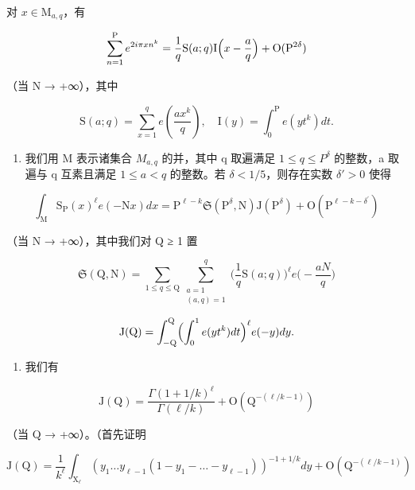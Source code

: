 对 \(x\in \mathrm{M}_{a,q}\)，有

\[
\sum_ {n = 1} ^ {\mathrm{P}} e ^ {2 i \pi x n ^ {k}} = \frac {1}{q} \mathrm{S} (a; q) \mathrm{I} \Bigl (x - \frac {a}{q} \Bigr) + \mathrm{O} (\mathrm{P} ^ {2 \delta})
\]

（当 N → +∞），其中

\[
\mathrm{S} (a; q) = \sum_ {x = 1} ^ {q} e \left(\frac {a x ^ {k}}{q}\right), \quad \mathrm{I} (y) = \int_ {0} ^ {\mathrm{P}} e \left(y t ^ {k}\right) d t.
\]

\begin{enumerate}
\def\labelenumi{\alph{enumi})}
\setcounter{enumi}{2}
\tightlist
\item
  我们用 M 表示诸集合 \(M_{a,q}\) 的并，其中 q 取遍满足 \(1 \leqslant q \leqslant P^{\delta}\) 的整数，a 取遍与 q 互素且满足 \(1 \leqslant a < q\) 的整数。若 \(\delta < 1/5\)，则存在实数 \(\delta' > 0\) 使得
\end{enumerate}

\[
\int_ {\mathrm{M}} \mathrm{S} _ {\mathrm{P}} (x) ^ {\ell} e (- \mathrm{N} x) d x = \mathrm{P} ^ {\ell - k} \mathfrak {S} (\mathrm{P} ^ {\delta}, \mathrm{N}) \mathrm{J} (\mathrm{P} ^ {\delta}) + \mathrm{O} (\mathrm{P} ^ {\ell - k - \delta^ {\prime}})
\]

（当 N → +∞），其中我们对 Q ≥ 1 置

\[
\mathfrak{S}(\mathrm{Q},\mathrm{N}) = \sum_{1\leqslant q\leqslant \mathrm{Q}}\sum_{\substack{a = 1\\ (a,q) = 1}}^{q}\Big(\frac{1}{q}\mathrm{S}(a;q)\Big)^{\ell}e\Big(-\frac{aN}{q}\Big)
\]

\[
\mathrm{J(Q)} = \int_ {- \mathrm{Q}} ^ {\mathrm{Q}} \Bigl (\int_ {0} ^ {1} e (y t ^ {k}) d t \Bigr) ^ {\ell} e (- y) d y.
\]

\begin{enumerate}
\def\labelenumi{\alph{enumi})}
\setcounter{enumi}{3}
\tightlist
\item
  我们有
\end{enumerate}

\[
\mathrm{J} (\mathrm{Q}) = \frac {\Gamma (1 + 1 / k) ^ {\ell}}{\Gamma (\ell / k)} + \mathrm{O} (\mathrm{Q} ^ {- (\ell / k - 1)})
\]

（当 Q → +∞）。（首先证明

\[
\mathrm{J} (\mathrm{Q}) = \frac {1}{k ^ {\ell}} \int_ {\mathrm{X} _ {\ell}} (y _ {1} \dots y _ {\ell - 1} (1 - y _ {1} - \dots - y _ {\ell - 1})) ^ {- 1 + 1 / k} d y + \mathrm{O} (\mathrm{Q} ^ {- (\ell / k - 1)})
\]

